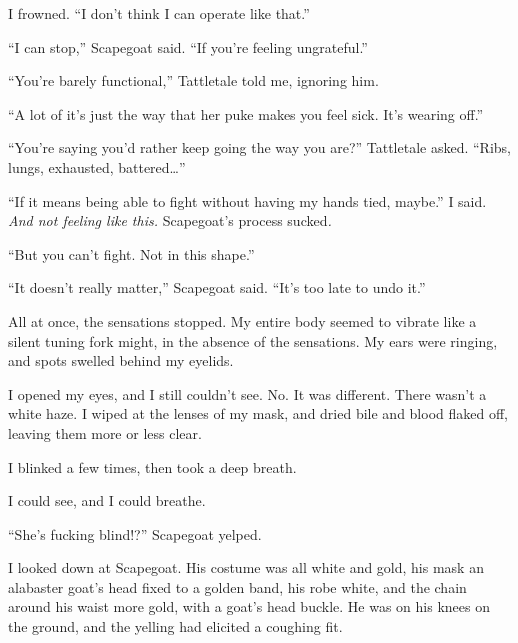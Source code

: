 I frowned.  ``I don't think I can operate like that.''



``I can stop,'' Scapegoat said.  ``If you're feeling ungrateful.''



``You're barely functional,'' Tattletale told me, ignoring him.



``A lot of it's just the way that her puke makes you feel sick.  It's wearing off.''



``You're saying you'd rather keep going the way you are?'' Tattletale asked.  ``Ribs, lungs, exhausted, battered\ldots''



``If it means being able to fight without having my hands tied, maybe.'' I said.  \emph{And not feeling like this.  }Scapegoat's process sucked\emph{.}



``But you can't fight.  Not in this shape.''



``It doesn't really matter,'' Scapegoat said.  ``It's too late to undo it.''



All at once, the sensations stopped.  My entire body seemed to vibrate like a silent tuning fork might, in the absence of the sensations.  My ears were ringing, and spots swelled behind my eyelids.



I opened my eyes, and I still couldn't see.  No.  It was different.  There wasn't a white haze.   I wiped at the lenses of my mask, and dried bile and blood flaked off, leaving them more or less clear.



I blinked a few times, then took a deep breath.



I could see, and I could breathe.



``She's fucking blind!?''  Scapegoat yelped.



I looked down at Scapegoat.  His costume was all white and gold, his mask an alabaster goat's head fixed to a golden band, his robe white, and the chain around his waist more gold, with a goat's head buckle.  He was on his knees on the ground, and the yelling had elicited a coughing fit.



